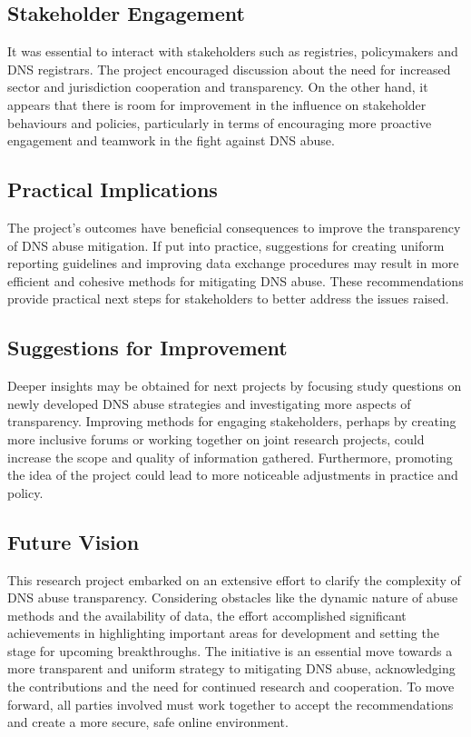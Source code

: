 \subsection{Stakeholder Engagement}

It was essential to interact with stakeholders such as registries, policymakers and DNS registrars. The project encouraged discussion about the need for increased sector and jurisdiction cooperation and transparency. On the other hand, it appears that there is room for improvement in the influence on stakeholder behaviours and policies, particularly in terms of encouraging more proactive engagement and teamwork in the fight against DNS abuse.

\subsection{Practical Implications}
The project's outcomes have beneficial consequences to improve the transparency of DNS abuse mitigation. If put into practice, suggestions for creating uniform reporting guidelines and improving data exchange procedures may result in more efficient and cohesive methods for mitigating DNS abuse. These recommendations provide practical next steps for stakeholders to better address the issues raised.

\subsection{Suggestions for Improvement}

Deeper insights may be obtained for next projects by focusing study questions on newly developed DNS abuse strategies and investigating more aspects of transparency. Improving methods for engaging stakeholders, perhaps by creating more inclusive forums or working together on joint research projects, could increase the scope and quality of information gathered. Furthermore, promoting the idea of the project could lead to more noticeable adjustments in practice and policy.

\subsection{Future Vision}

This research project embarked on an extensive effort to clarify the complexity of DNS abuse transparency. Considering obstacles like the dynamic nature of abuse methods and the availability of data, the effort accomplished significant achievements in highlighting important areas for development and setting the stage for upcoming breakthroughs. The initiative is an essential move towards a more transparent and uniform strategy to mitigating DNS abuse, acknowledging the contributions and the need for continued research and cooperation. To move forward, all parties involved must work together to accept the recommendations and create a more secure, safe online environment.
